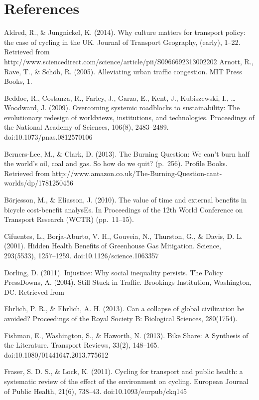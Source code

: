 \section{References}\label{references}

Aldred, R., \& Jungnickel, K. (2014). Why culture matters for transport
policy: the case of cycling in the UK. Journal of Transport Geography,
(early), 1--22. Retrieved from
http://www.sciencedirect.com/science/article/pii/S0966692313002202
Arnott, R., Rave, T., \& Schöb, R. (2005). Alleviating urban traffic
congestion. MIT Press Books, 1.

Beddoe, R., Costanza, R., Farley, J., Garza, E., Kent, J., Kubiszewski,
I., \ldots{} Woodward, J. (2009). Overcoming systemic roadblocks to
sustainability: The evolutionary redesign of worldviews, institutions,
and technologies. Proceedings of the National Academy of Sciences,
106(8), 2483--2489. doi:10.1073/pnas.0812570106

Berners-Lee, M., \& Clark, D. (2013). The Burning Question: We can't
burn half the world's oil, coal and gas. So how do we quit? (p.~256).
Profile Books. Retrieved from
http://www.amazon.co.uk/The-Burning-Question-cant-worlds/dp/1781250456

Börjesson, M., \& Eliasson, J. (2010). The value of time and external
benefits in bicycle cost-benefit analysEs. In Proceedings of the 12th
World Conference on Transport Research (WCTR) (pp.~11--15).

Cifuentes, L., Borja-Aburto, V. H., Gouveia, N., Thurston, G., \& Davis,
D. L. (2001). Hidden Health Benefits of Greenhouse Gas Mitigation.
Science, 293(5533), 1257--1259. doi:10.1126/science.1063357

Dorling, D. (2011). Injustice: Why social inequality persists. The
Policy PressDowns, A. (2004). Still Stuck in Trafﬁc. Brookings
Institution, Washington, DC. Retrieved from

Ehrlich, P. R., \& Ehrlich, A. H. (2013). Can a collapse of global
civilization be avoided? Proceedings of the Royal Society B: Biological
Sciences, 280(1754).

Fishman, E., Washington, S., \& Haworth, N. (2013). Bike Share: A
Synthesis of the Literature. Transport Reviews, 33(2), 148--165.
doi:10.1080/01441647.2013.775612

Fraser, S. D. S., \& Lock, K. (2011). Cycling for transport and public
health: a systematic review of the effect of the environment on cycling.
European Journal of Public Health, 21(6), 738--43.
doi:10.1093/eurpub/ckq145

